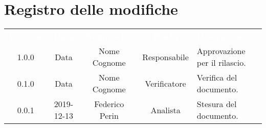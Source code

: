 \section*{Registro delle modifiche}
{
\renewcommand{\arraystretch}{1.5}
\centering
\begin{longtable}{ c c  c  c C{4cm}}
\textcolor{white}{\textbf{Versione}} & \textcolor{white}{\textbf{Data}} & \textcolor{white}{\textbf{Nominativo}} & \textcolor{white}{\textbf{Ruolo}} & \textcolor{white}{\textbf{Descrizione}}\\	


1.0.0 & Data & Nome Cognome & Responsabile & Approvazione per il rilascio.  \\
		
0.1.0 & Data & Nome Cognome & Verificatore & Verifica del documento.  \\
		
0.0.1 & 2019-12-13 & Federico Perin & Analista & Stesura del documento.  \\
		
		
\end{longtable}
}